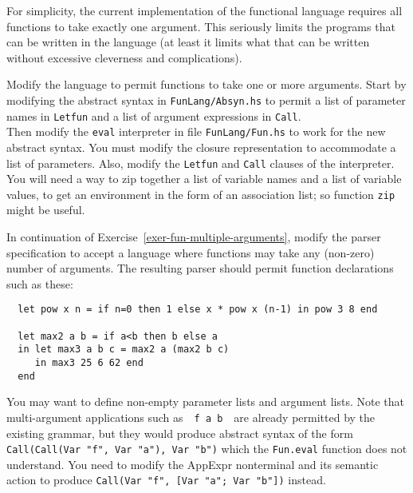\documentclass[a4paper]{article}
\begin{document}
\begin{exercise}\label{exer-fun-multiple-arguments}
  For simplicity, the current implementation of the functional
  language requires all functions to take exactly one argument.  This
  seriously limits the programs that can be written in the language
  (at least it limits what that can be written without excessive
  cleverness and complications).
  
  Modify the language to permit functions to take one or more
  arguments.  Start by modifying the abstract syntax in
  \texttt{FunLang/Absyn.hs} to permit a list of parameter names in
  \texttt{Letfun} and a list of argument expressions in
  \texttt{Call}\@.  \\
  

  
  Then modify the \texttt{eval} interpreter in file
  \texttt{FunLang/Fun.hs} to work for the new abstract syntax.  You must
  modify the closure representation to accommodate a list of
  parameters.  Also, modify the \texttt{Letfun} and \texttt{Call}
  clauses of the interpreter.  You will need a way to zip together a
  list of variable names and a list of variable values, to get an
  environment in the form of an association list; so function
  \texttt{zip} might be useful.\\
  

  
\end{exercise}

\begin{exercise}\label{exer-fun-multiple-arguments-parse}
  In continuation of Exercise~\ref{exer-fun-multiple-arguments},
  modify the parser specification to accept a language where functions
  may take any (non-zero) number of arguments.  The resulting parser
  should permit function declarations such as these:

{\codesetup\begin{verbatim}
  let pow x n = if n=0 then 1 else x * pow x (n-1) in pow 3 8 end

  let max2 a b = if a<b then b else a
  in let max3 a b c = max2 a (max2 b c)
     in max3 25 6 62 end
  end
\end{verbatim}}


\noindent 
You may want to define non-empty parameter lists and argument lists.  Note that multi-argument applications such as\ \ 
\texttt{f a b}\ \ are already permitted by the existing grammar, but
they would produce abstract syntax of the form \texttt{Call(Call(Var
  "f", Var "a"), Var "b")} which the \texttt{Fun.eval} function does
not understand.  You need to modify the AppExpr nonterminal and its
semantic action to produce \texttt{Call(Var "f", [Var "a"; Var "b"])}
instead.\\


\end{exercise}
\end{document}
